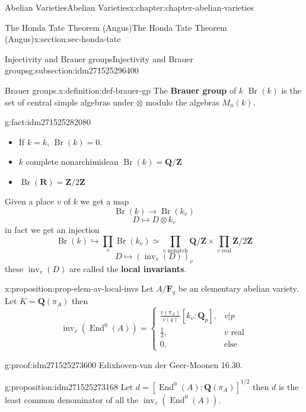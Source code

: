 \documentclass[oneside,10pt,]{book}
\newcommand{\terminology}[1]{\textbf{#1}}
\numberwithin{equation}{section}
\newcommand{\lb}{[}
\newcommand{\rb}{]}
\newcommand{\ZZ}{\mathbf{Z}}
\newcommand{\QQ}{\mathbf{Q}}
\newcommand{\RR}{\mathbf{R}}
\newcommand{\FF}{\mathbf{F}}
\DeclareMathOperator{\End}{End}
\newcommand{\amp}{&}
\begin{document}
\begin{chapterptx}{Abelian Varieties}{}{Abelian Varieties}{}{}{x:chapter:chapter-abelian-varieties}
\begin{sectionptx}{The Honda Tate Theorem (Angus)}{}{The Honda Tate Theorem (Angus)}{}{}{x:section:sec-honda-tate}
\begin{subsectionptx}{Injectivity and Brauer groups}{}{Injectivity and Brauer groups}{}{}{g:subsection:idm271525296400}
\begin{definition}{Brauer groups.}{x:definition:def-brauer-gp}
The \terminology{Brauer group} of \(k\) \(\operatorname{Br}(k)\) is the set of central simple algebras under \(\otimes\) modulo the algebras \(M_n(k)\).%
\end{definition}
\begin{fact}{}{}{g:fact:idm271525282080}%
%
\begin{itemize}[label=\textbullet]
\item{}If \(k = \overline k\), \(\operatorname{Br}(k) = 0\).%
\item{}\(k\) complete nonarchimidean \(\operatorname{Br}(k) = \QQ/\ZZ\)%
\item{}\(\operatorname{Br}(\RR) = \ZZ/2\ZZ\)%
\end{itemize}
Given a place \(v\) of \(k\) we get a map%
\begin{equation*}
\operatorname{Br}(k) \to \operatorname{Br}(k_v)
\end{equation*}
%
\begin{equation*}
D \mapsto D\otimes k_v
\end{equation*}
in fact we get an injection%
\begin{equation*}
\operatorname{Br}(k) \hookrightarrow \prod_v \operatorname{Br}(k_v) \simeq \prod_{v\text{ nonarch}} \QQ/\ZZ \times \prod_{v\text{ real}} \ZZ/2\ZZ
\end{equation*}
%
\begin{equation*}
D\mapsto (\operatorname{inv}_v(D))_v
\end{equation*}
these \(\operatorname{inv}_v(D)\) are called the \terminology{local invariants}.%
\end{fact}
\begin{proposition}{}{}{x:proposition:prop-elem-av-local-invs}%
Let \(A/\FF_q\) be an elementary abelian variety. Let \(K = \QQ(\pi_A)\) then%
\begin{equation*}
\operatorname{inv}_v(\End^0(A)) = \begin{cases} \frac{v(\pi_A)}{v(q)} [k_v: \QQ_p], \amp v|p\\ \frac 12,\amp v\text{ real}\\ 0, \amp \text{else}\end{cases}
\end{equation*}
%
\end{proposition}
\begin{proofptx}{}{g:proof:idm271525273600}
Edixhoven-van der Geer-Moonen 16.30.%
\end{proofptx}
\begin{proposition}{}{}{g:proposition:idm271525273168}%
Let \(d= \lb \End^0(A) : \QQ(\pi_A) \rb^{1/2}\) then \(d\) is the least common denominator of all the \(\operatorname{inv}_v(\End^0(A))\).%

\end{proposition}
\end{subsectionptx}
\end{sectionptx}
\end{chapterptx}
\end{document}
